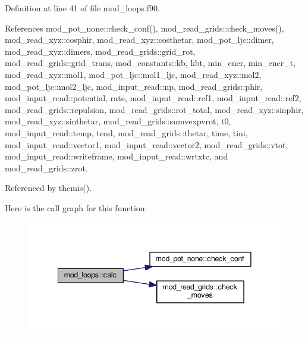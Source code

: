 Definition at line 41 of file mod\+\_\+loops.\+f90.



References mod\+\_\+pot\+\_\+none\+::check\+\_\+conf(), mod\+\_\+read\+\_\+grids\+::check\+\_\+moves(), mod\+\_\+read\+\_\+xyz\+::cosphir, mod\+\_\+read\+\_\+xyz\+::costhetar, mod\+\_\+pot\+\_\+ljc\+::dimer, mod\+\_\+read\+\_\+xyz\+::dimers, mod\+\_\+read\+\_\+grids\+::grid\+\_\+rot, mod\+\_\+read\+\_\+grids\+::grid\+\_\+trans, mod\+\_\+constants\+::kb, kbt, min\+\_\+ener, min\+\_\+ener\+\_\+t, mod\+\_\+read\+\_\+xyz\+::mol1, mod\+\_\+pot\+\_\+ljc\+::mol1\+\_\+ljc, mod\+\_\+read\+\_\+xyz\+::mol2, mod\+\_\+pot\+\_\+ljc\+::mol2\+\_\+ljc, mod\+\_\+input\+\_\+read\+::np, mod\+\_\+read\+\_\+grids\+::phir, mod\+\_\+input\+\_\+read\+::potential, rate, mod\+\_\+input\+\_\+read\+::ref1, mod\+\_\+input\+\_\+read\+::ref2, mod\+\_\+read\+\_\+grids\+::repulsion, mod\+\_\+read\+\_\+grids\+::rot\+\_\+total, mod\+\_\+read\+\_\+xyz\+::sinphir, mod\+\_\+read\+\_\+xyz\+::sinthetar, mod\+\_\+read\+\_\+grids\+::sumvexpvrot, t0, mod\+\_\+input\+\_\+read\+::temp, tend, mod\+\_\+read\+\_\+grids\+::thetar, time, tini, mod\+\_\+input\+\_\+read\+::vector1, mod\+\_\+input\+\_\+read\+::vector2, mod\+\_\+read\+\_\+grids\+::vtot, mod\+\_\+input\+\_\+read\+::writeframe, mod\+\_\+input\+\_\+read\+::wrtxtc, and mod\+\_\+read\+\_\+grids\+::zrot.



Referenced by themis().



Here is the call graph for this function\+:\nopagebreak
\begin{figure}[H]
\begin{center}
\leavevmode
\includegraphics[width=341pt]{namespacemod__loops_a6e4de9cf9c585c364502a63d328071bd_cgraph}
\end{center}
\end{figure}


